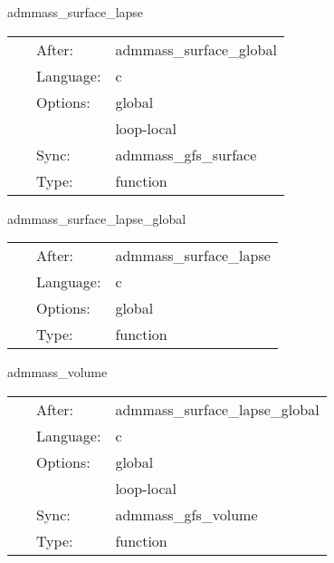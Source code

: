\hspace{5mm} admmass\_surface\_lapse 

\hspace{5mm}{\it calculate the admmass*lapse using a surface integral: local routine } 


\hspace{5mm}

 \begin{tabular*}{160mm}{cll} 
~ & After:  & admmass\_surface\_global \\ 
~ & Language:  & c \\ 
~ & Options:  & global \\ 
~& ~ &loop-local\\ 
~ & Sync:  & admmass\_gfs\_surface \\ 
~ & Type:  & function \\ 
\end{tabular*} 


\vspace{5mm}


\hspace{5mm} admmass\_surface\_lapse\_global 

\hspace{5mm}{\it calculate the admmass*lapse using a surface integral: global routine } 


\hspace{5mm}

 \begin{tabular*}{160mm}{cll} 
~ & After:  & admmass\_surface\_lapse \\ 
~ & Language:  & c \\ 
~ & Options:  & global \\ 
~ & Type:  & function \\ 
\end{tabular*} 


\vspace{5mm}


\hspace{5mm} admmass\_volume 

\hspace{5mm}{\it calculate the admmass using a volume integral: local routine } 


\hspace{5mm}

 \begin{tabular*}{160mm}{cll} 
~ & After:  & admmass\_surface\_lapse\_global \\ 
~ & Language:  & c \\ 
~ & Options:  & global \\ 
~& ~ &loop-local\\ 
~ & Sync:  & admmass\_gfs\_volume \\ 
~ & Type:  & function \\ 
\end{tabular*} 


